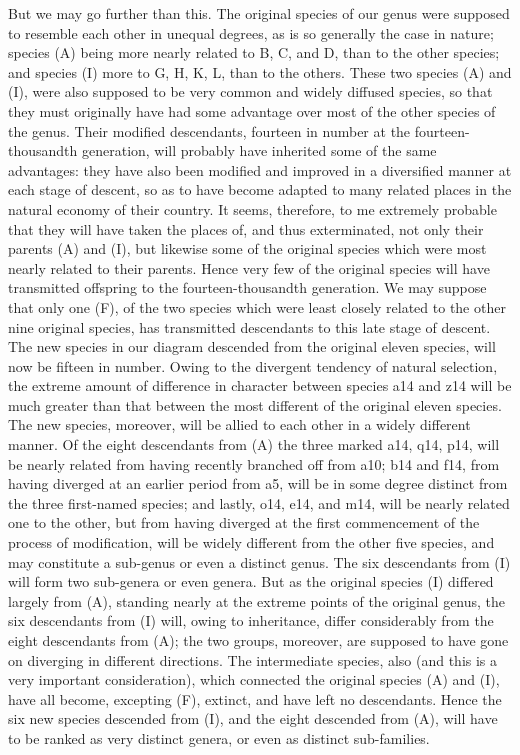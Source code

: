 But we may go further than this. The original species of our genus were supposed to resemble each other in unequal degrees, as is so generally the case in nature; species (A) being more nearly related to B, C, and D, than to the other species; and species (I) more to G, H, K, L, than to the others. These two species (A) and (I), were also supposed to be very common and widely diffused species, so that they must originally have had some advantage over most of the other species of the genus. Their modified descendants, fourteen in number at the fourteen-thousandth generation, will probably have inherited some of the same advantages: they have also been modified and improved in a diversified manner at each stage of descent, so as to have become adapted to many related places in the natural economy of their country. It seems, therefore, to me extremely probable that they will have taken the places of, and thus exterminated, not only their parents (A) and (I), but likewise some of the original species which were most nearly related to their parents. Hence very few of the original species will have transmitted offspring to the fourteen-thousandth generation. We may suppose that only one (F), of the two species which were least closely related to the other nine original species, has transmitted descendants to this late stage of descent.
The new species in our diagram descended from the original eleven species, will now be fifteen in number. Owing to the divergent tendency of natural selection, the extreme amount of difference in character between species a14 and z14 will be much greater than that between the most different of the original eleven species. The new species, moreover, will be allied to each other in a widely different manner. Of the eight descendants from (A) the three marked a14, q14, p14, will be nearly related from having recently branched off from a10; b14 and f14, from having diverged at an earlier period from a5, will be in some degree distinct from the three first-named species; and lastly, o14, e14, and m14, will be nearly related one to the other, but from having diverged at the first commencement of the process of modification, will be widely different from the other five species, and may constitute a sub-genus or even a distinct genus.
The six descendants from (I) will form two sub-genera or even genera. But as the original species (I) differed largely from (A), standing nearly at the extreme points of the original genus, the six descendants from (I) will, owing to inheritance, differ considerably from the eight descendants from (A); the two groups, moreover, are supposed to have gone on diverging in different directions. The intermediate species, also (and this is a very important consideration), which connected the original species (A) and (I), have all become, excepting (F), extinct, and have left no descendants. Hence the six new species descended from (I), and the eight descended from (A), will have to be ranked as very distinct genera, or even as distinct sub-families.
